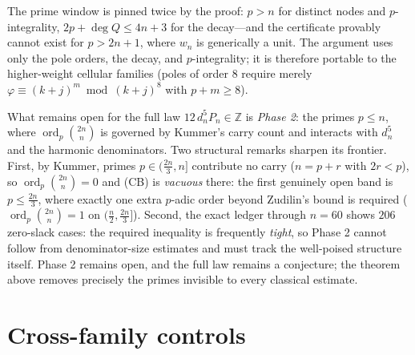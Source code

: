 \documentclass[11pt]{article}
\theoremstyle{definition}
\newcommand{\dn}[1]{d_{#1}}
\newcommand{\ord}{\operatorname{ord}}
\newcommand{\Z}{\mathbb{Z}}
\begin{document}
The prime window is pinned twice by the proof: $p>n$ for distinct
nodes and $p$-integrality, $2p+\deg Q\le 4n+3$ for the decay---and
the certificate provably cannot exist for $p>2n+1$, where $w_n$ is
generically a unit. The argument uses only the pole orders, the decay,
and $p$-integrality; it is therefore portable to the higher-weight
cellular families (poles of order $8$ require merely
$\varphi\equiv(k+j)^{m}\bmod{(k+j)^8}$ with $p+m\ge 8$).

What remains open for the full law $12\,\dn{n}^5P_n\in\Z$ is
\emph{Phase 2}: the primes $p\le n$, where $\ord_p\binom{2n}{n}$ is
governed by Kummer's carry count and interacts with $\dn{n}^5$ and the
harmonic denominators. Two structural remarks sharpen its frontier.
First, by Kummer, primes $p\in(\tfrac{2n}3,n]$ contribute no carry
($n=p+r$ with $2r<p$), so $\ord_p\binom{2n}{n}=0$ and (CB) is
\emph{vacuous} there: the first genuinely open band is
$p\le\tfrac{2n}3$, where exactly one extra $p$-adic order beyond
Zudilin's bound is required ($\ord_p\binom{2n}{n}=1$ on
$(\tfrac n2,\tfrac{2n}3]$). Second, the exact ledger through $n=60$
shows $206$ zero-slack cases: the required inequality is frequently
\emph{tight}, so Phase 2 cannot follow from denominator-size estimates
and must track the well-poised structure itself. Phase 2 remains open,
and the full law remains a conjecture; the theorem above removes
precisely the primes invisible to every classical estimate.

\section{Cross-family controls}\label{sec:crossfamily}
\end{document}
